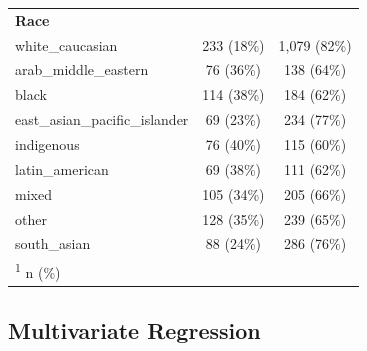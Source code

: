 \documentclass[
  letterpaper,
  DIV=11,
  numbers=noendperiod]{scrartcl}
\begin{document}
\begin{table}
\begin{tabular}{lcc}
\textbf{Race} &  & \\
\hspace{1em}white\_caucasian & 233 (18\%) & 1,079 (82\%)\\
\hspace{1em}arab\_middle\_eastern & 76 (36\%) & 138 (64\%)\\
\hspace{1em}black & 114 (38\%) & 184 (62\%)\\
\hspace{1em}east\_asian\_pacific\_islander & 69 (23\%) & 234 (77\%)\\
\hspace{1em}indigenous & 76 (40\%) & 115 (60\%)\\
\hspace{1em}latin\_american & 69 (38\%) & 111 (62\%)\\
\hspace{1em}mixed & 105 (34\%) & 205 (66\%)\\
\hspace{1em}other & 128 (35\%) & 239 (65\%)\\
\hspace{1em}south\_asian & 88 (24\%) & 286 (76\%)\\
\bottomrule
\multicolumn{3}{l}{\rule{0pt}{1em}\textsuperscript{1} n (\%)}\\
\end{tabular}
\endgroup{}
\end{table}

\hypertarget{multivariate-regression}{%
\subsection{Multivariate Regression}\label{multivariate-regression}}
\end{document}
